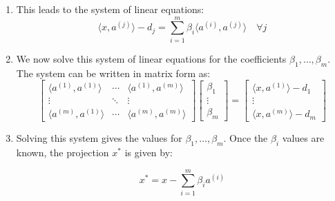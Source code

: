\begin{derivation}
\begin{enumerate}
                \item This leads to the system of linear equations:
                \[
                \langle x, a^{(j)} \rangle - d_j = \sum_{i=1}^{m} \beta_i \langle a^{(i)}, a^{(j)} \rangle \quad \forall j
                \]
                
                \item We now solve this system of linear equations for the coefficients $\beta_1, \dots, \beta_m$. The system can be written in matrix form as:
                \[
                \begin{bmatrix}
                \langle a^{(1)}, a^{(1)} \rangle & \cdots & \langle a^{(1)}, a^{(m)} \rangle \\
                \vdots & \ddots & \vdots \\
                \langle a^{(m)}, a^{(1)} \rangle & \cdots & \langle a^{(m)}, a^{(m)} \rangle
                \end{bmatrix}
                \begin{bmatrix}
                \beta_1 \\
                \vdots \\
                \beta_m
                \end{bmatrix}
                =
                \begin{bmatrix}
                \langle x, a^{(1)} \rangle - d_1 \\
                \vdots \\
                \langle x, a^{(m)} \rangle - d_m
                \end{bmatrix}
                \]
                
                \item Solving this system gives the values for $\beta_1, \dots, \beta_m$. Once the $\beta_i$ values are known, the projection $x^*$ is given by:
                
                \[
                x^* = x - \sum_{i=1}^{m} \beta_i a^{(i)} 
                \]
            \end{enumerate}            
        \end{derivation}

